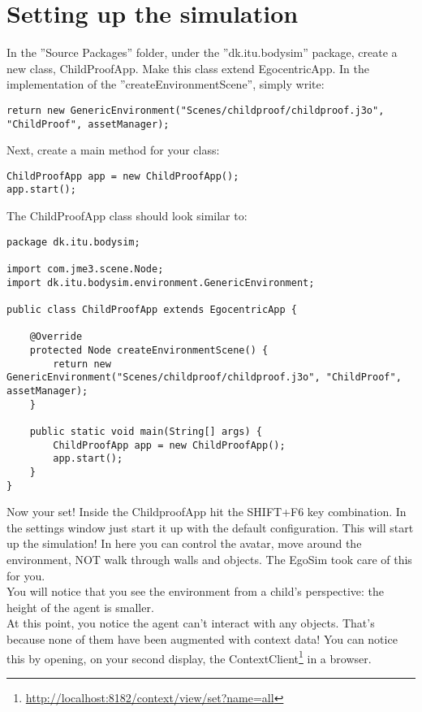 \section{Setting up the simulation} %
\label{sec:sd_setup_simulation}
In the ''Source Packages'' folder, under the ''dk.itu.bodysim'' package, create a new class, ChildProofApp. Make this class extend EgocentricApp. In the implementation of the ''createEnvironmentScene'', simply write:
\begin{lstlisting}[caption={Loading a j3o environment},label={lst:importing_model}]
return new GenericEnvironment("Scenes/childproof/childproof.j3o", "ChildProof", assetManager);
\end{lstlisting}

Next, create a main method for your class:
\begin{lstlisting}[caption={Starting the app},label={lst:starting_the_simulation}]
ChildProofApp app = new ChildProofApp(); 
app.start();
\end{lstlisting}

The ChildProofApp class should look similar to:
\begin{lstlisting}[caption={Full class implementation of a new simulation created with EgoSim},label={lst:final_childproof}]
package dk.itu.bodysim;

import com.jme3.scene.Node;
import dk.itu.bodysim.environment.GenericEnvironment;

public class ChildProofApp extends EgocentricApp {

    @Override
    protected Node createEnvironmentScene() {
        return new GenericEnvironment("Scenes/childproof/childproof.j3o", "ChildProof", assetManager);
    }

    public static void main(String[] args) {
        ChildProofApp app = new ChildProofApp();
        app.start();
    }
}
\end{lstlisting}

Now your set! Inside the ChildproofApp hit the SHIFT+F6 key combination. In the settings window just start it up with the default configuration. This will start up the simulation! In here you can control the avatar, move around the environment, NOT walk through walls and objects. The EgoSim took care of this for you.\\

You will notice that you see the environment from a child's perspective: the height of the agent is smaller.\\

At this point, you notice the agent can't interact with any objects. That's because none of them have been augmented with context data! You can notice this by opening, on your second display, the ContextClient\footnote{\url{http://localhost:8182/context/view/set?name=all}} in a browser.

